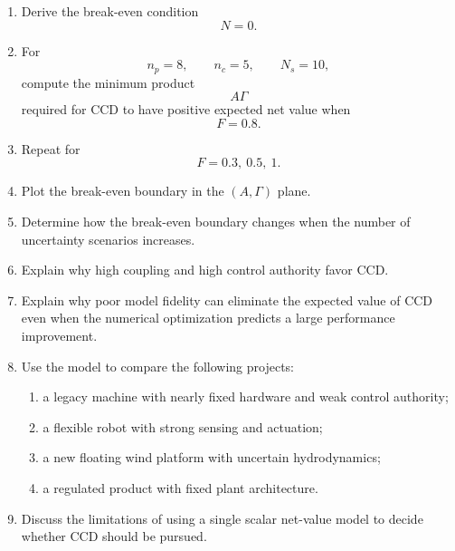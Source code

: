 \begin{enumerate}
    \item Derive the break-even condition
    \begin{equation}
    N=0.
    \end{equation}

    \item For
    \begin{equation}
    n_p=8,
    \qquad
    n_c=5,
    \qquad
    N_s=10,
    \end{equation}
    compute the minimum product
    \begin{equation}
    A\Gamma
    \end{equation}
    required for CCD to have positive expected net value when
    \begin{equation}
    F=0.8.
    \end{equation}

    \item Repeat for
    \begin{equation}
    F=0.3,\ 0.5,\ 1.
    \end{equation}

    \item Plot the break-even boundary in the $(A,\Gamma)$ plane.

    \item Determine how the break-even boundary changes when the number of
    uncertainty scenarios increases.

    \item Explain why high coupling and high control authority favor CCD.

    \item Explain why poor model fidelity can eliminate the expected value
    of CCD even when the numerical optimization predicts a large
    performance improvement.

    \item Use the model to compare the following projects:
    \begin{enumerate}
        \item a legacy machine with nearly fixed hardware and weak control
        authority;
        \item a flexible robot with strong sensing and actuation;
        \item a new floating wind platform with uncertain hydrodynamics;
        \item a regulated product with fixed plant architecture.
    \end{enumerate}

    \item Discuss the limitations of using a single scalar net-value model to
    decide whether CCD should be pursued.
\end{enumerate}
